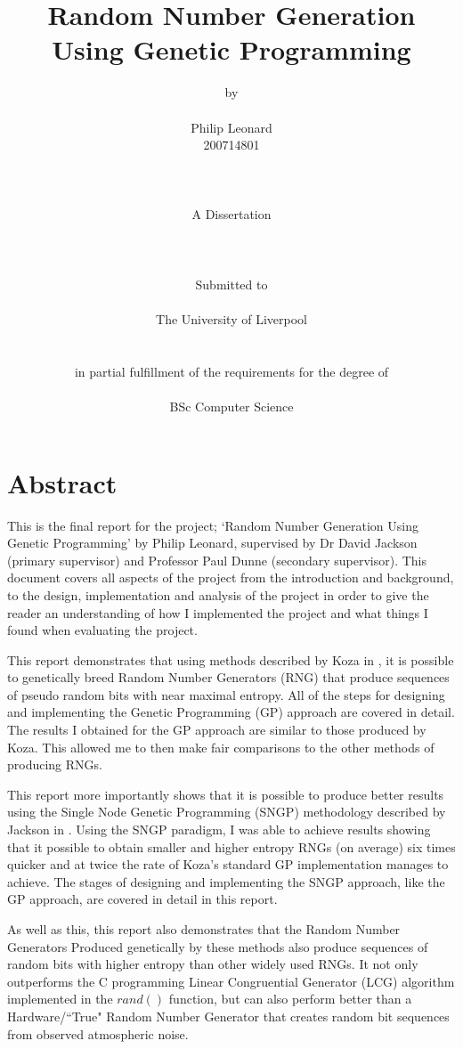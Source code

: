 \documentclass[a4paper,10.5pt]{article}
\title{Random Number Generation Using Genetic Programming}
\author{{\small by}\\\\Philip Leonard\\ 200714801 \\\\\\\\ A Dissertation \\\\\\\\ {\large Submitted to} \\\\{\Large The University of Liverpool} \\\\\\{\normalsize  in partial fulfillment of the requirements for the degree of}\\\\{\Large BSc Computer Science}}
\begin{document}
\begin{titlepage}
\maketitle
\end{titlepage}

\tableofcontents
\newpage
\listoffigures
\listoftables
\newpage
\section{Abstract}

This is the final report for the project; `Random Number Generation Using Genetic Programming' by Philip Leonard, supervised by Dr David Jackson (primary supervisor) and Professor Paul Dunne (secondary supervisor). This document covers all aspects of the project from the introduction and background, to the design, implementation and analysis of the project in order to give the reader an understanding of how I implemented the project and what things I found when evaluating the project.

This report demonstrates that using methods described by Koza in \cite{kozarng}, it is possible to genetically breed Random Number Generators (RNG) that produce sequences of pseudo random bits with near maximal entropy. All of the steps for designing and implementing the Genetic Programming (GP) approach are covered in detail. The results I obtained for the GP approach are similar to those produced by Koza. This allowed me to then make fair comparisons to the other methods of producing RNGs.

This report more importantly shows that it is possible to produce better results using the Single Node Genetic Programming (SNGP) methodology described by Jackson in \cite{jacksonsngp}. Using the SNGP paradigm, I was able to achieve results showing that it possible to obtain smaller and higher entropy RNGs (on average) six times quicker and at twice the rate of Koza's standard GP implementation manages to achieve. The stages of designing and implementing the SNGP approach, like the GP approach, are covered in detail in this report.

As well as this, this report also demonstrates that the Random Number Generators Produced genetically by these methods also produce sequences of random bits with higher entropy than other widely used RNGs. It not only outperforms the C programming Linear Congruential Generator (LCG) algorithm implemented in the $rand()$ function, but can also perform better than a Hardware/``True" Random Number Generator that creates random bit sequences from observed atmospheric noise.
\end{document}
